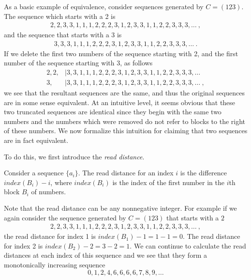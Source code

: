 \documentclass[runningheads,a4paper]{llncs}
\begin{document}
As a basic example of equivalence, consider sequences generated by $C = (123)$. The sequence which starts with a 2 is 
\begin{align*}
2,2,3,3,1,1,1,2,2,2,3,1,2,3,3,1,1,2,2,3,3,3,\dots \ ,
\end{align*}
and the sequence that starts with a 3 is 
\begin{align*}
3,3,3,1,1,1,2,2,2,3,1,2,3,3,1,1,2,2,3,3,3,\dots \ .
\end{align*}
If we delete the first two numbers of the sequence starting with 2, and the first number of the sequence starting with 3, as follows
\begin{align*}
2,2,&|3,3,1,1,1,2,2,2,3,1,2,3,3,1,1,2,2,3,3,3,\dots\\
3,&|3,3,1,1,1,2,2,2,3,1,2,3,3,1,1,2,2,3,3,3,\dots \ ,
\end{align*}
we see that the resultant sequences are the same, and thus the original sequences are in some sense equivalent. At an intuitive level, it seems obvious that these two truncated sequences are identical since they begin with the same two numbers and the numbers which were removed do not refer to blocks to the right of these numbers. We now formalize this intuition for claiming that two sequences are in fact equivalent.

To do this, we first introduce the \emph{read distance}.
\begin{definition} Consider a sequence $\{a_i\}$. The read distance for an index $i$ is the difference $index(B_i) - i$, where $index(B_i)$ is the index of the first number in the $i$th block $B_i$ of numbers.
\end{definition}
Note that the read distance can be any nonnegative integer. For example if we again consider the sequence generated by $C = (1 2 3)$ that starts with a $2$
\begin{align*}
2,2,3,3,1,1,1,2,2,2,3,1,2,3,3,1,1,2,2,3,3,3,\dots \ ,
\end{align*}
the read distance for index 1 is $index(B_1) - 1 = 1 - 1 = 0$. The read distance for index 2 is $index(B_2) - 2 = 3 - 2 = 1$. We can continue to calculate the read distances at each index of this sequence and we see that they form a monotonically increasing sequence 
\[ 0,1,2,4,6,6,6,6,7,8,9,\ldots \]
\end{document}

